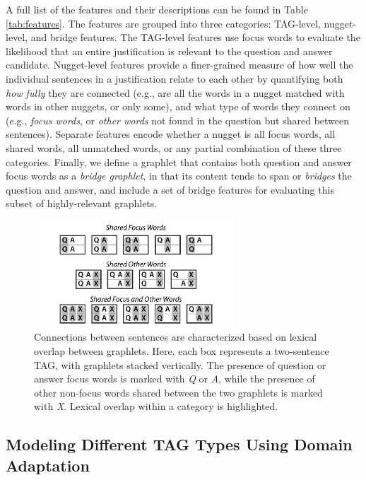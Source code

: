 A full list of the features and their descriptions can be found in Table \ref{tab:features}.
%
The features are grouped into three categories: TAG-level, nugget-level, and bridge features. 
The TAG-level features use focus words to evaluate the likelihood that an entire justification is relevant to the question and answer candidate. 
Nugget-level features provide a finer-grained measure of how well the individual sentences in a justification relate to each other by quantifying both \emph{how fully} they are connected (e.g., are all the words in a nugget matched with words in other nuggets, or only some), and what type of words they connect on (e.g., \emph{focus words}, or \emph{other words} not found in the question but shared between sentences).
Separate features encode whether a nugget is all focus words, all shared words, all unmatched words, or any partial combination of these three categories.
Finally, we define a graphlet that contains both question and answer focus words as a \emph{bridge graphlet}, in that its content tends to span or \emph{bridges} the question and answer, and include a set of bridge features for evaluating this subset of highly-relevant graphlets. 




\begin{figure}[t!]
\begin{center}
\includegraphics[width=75mm]{mainmatter/tacl2015-tig/connection_types.pdf}
\caption{{Connections between sentences are characterized based on lexical overlap between graphlets.
Here, each box represents a two-sentence TAG, with graphlets stacked vertically.  The presence of question or answer focus words is marked with \emph{Q} or \emph{A}, while the presence of other non-focus words shared between the two graphlets is marked with \emph{X}.  Lexical overlap within a category is highlighted.
}}
\label{fig:connectiontypes}
\end{center}
\end{figure}


\subsection {Modeling Different TAG Types Using Domain Adaptation} %
\label{sec-cl2017:characterizing}

